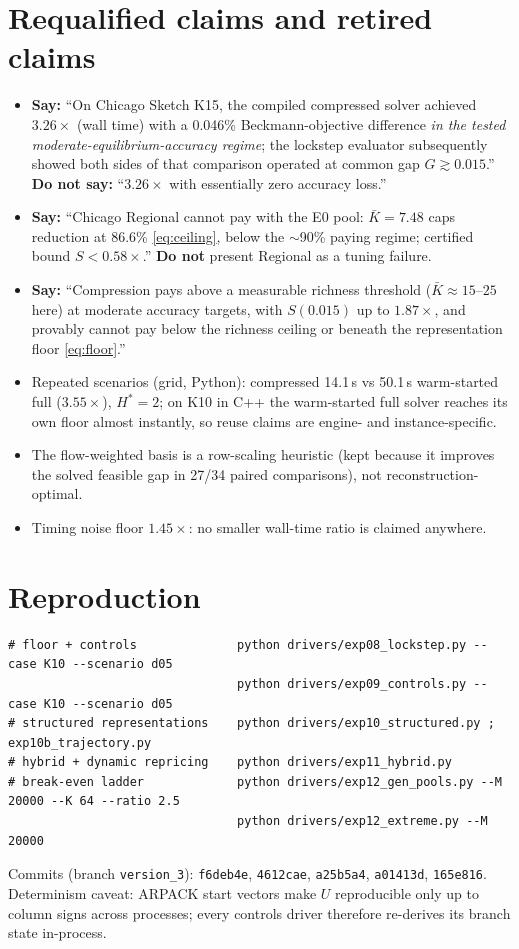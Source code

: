 \documentclass[11pt]{article}
\newcommand{\Kbar}{\bar K}
\begin{document}
\section{Requalified claims and retired claims}\label{sec:requal}

\begin{itemize}\itemsep2pt
\item \textbf{Say:} ``On Chicago Sketch K15, the compiled compressed solver achieved
$3.26\times$ (wall time) with a 0.046\% Beckmann-objective difference \emph{in the
tested moderate-equilibrium-accuracy regime}; the lockstep evaluator subsequently showed
both sides of that comparison operated at common gap $G\gtrsim0.015$.''
\textbf{Do not say:} ``$3.26\times$ with essentially zero accuracy loss.''
\item \textbf{Say:} ``Chicago Regional cannot pay with the E0 pool: $\Kbar=7.48$ caps
reduction at 86.6\% \eqref{eq:ceiling}, below the $\sim$90\% paying regime; certified
bound $S<0.58\times$.'' \textbf{Do not} present Regional as a tuning failure.
\item \textbf{Say:} ``Compression pays above a measurable richness threshold
($\Kbar\approx15$--$25$ here) at moderate accuracy targets, with $S(0.015)$ up to
$1.87\times$, and provably cannot pay below the richness ceiling or beneath the
representation floor \eqref{eq:floor}.''
\item Repeated scenarios (grid, Python): compressed 14.1\,s vs 50.1\,s warm-started full
($3.55\times$), $H^\ast=2$; on K10 in C++ the warm-started full solver reaches its own
floor almost instantly, so reuse claims are engine- and instance-specific.
\item The flow-weighted basis is a row-scaling heuristic (kept because it improves the
solved feasible gap in 27/34 paired comparisons), not reconstruction-optimal.
\item Timing noise floor $1.45\times$: no smaller wall-time ratio is claimed anywhere.
\end{itemize}

\section*{Reproduction}
\small
\begin{verbatim}
# floor + controls              python drivers/exp08_lockstep.py --case K10 --scenario d05
                                python drivers/exp09_controls.py --case K10 --scenario d05
# structured representations    python drivers/exp10_structured.py ; exp10b_trajectory.py
# hybrid + dynamic repricing    python drivers/exp11_hybrid.py
# break-even ladder             python drivers/exp12_gen_pools.py --M 20000 --K 64 --ratio 2.5
                                python drivers/exp12_extreme.py --M 20000
\end{verbatim}
Commits (branch \texttt{version\_3}): \texttt{f6deb4e}, \texttt{4612cae},
\texttt{a25b5a4}, \texttt{a01413d}, \texttt{165e816}. Determinism caveat: ARPACK start
vectors make $U$ reproducible only up to column signs across processes; every controls
driver therefore re-derives its branch state in-process.
\end{document}
